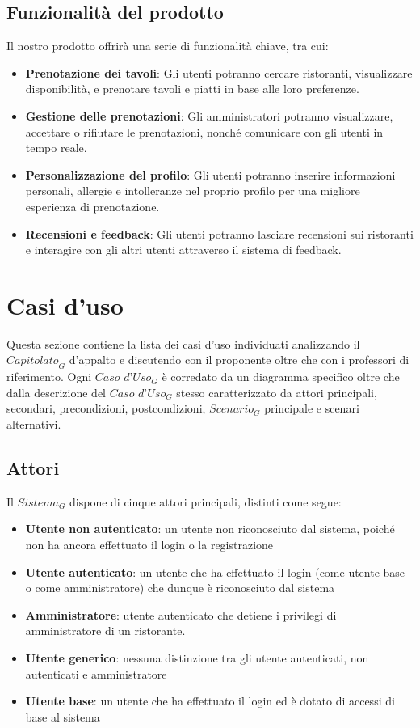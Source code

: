 \documentclass[12pt, oneside]{article}
\begin{document}
\subsection{Funzionalità del prodotto}
Il nostro prodotto offrirà una serie di funzionalità chiave, tra cui:
\begin{itemize}
\item \textbf{Prenotazione dei tavoli}: Gli utenti potranno cercare ristoranti, visualizzare disponibilità, e prenotare tavoli e piatti in base alle loro preferenze.
\item \textbf{Gestione delle prenotazioni}: Gli amministratori potranno visualizzare, accettare o rifiutare le prenotazioni, nonché comunicare con gli utenti in tempo reale.
\item \textbf{Personalizzazione del profilo}: Gli utenti potranno inserire informazioni personali, allergie e intolleranze nel proprio profilo per una migliore esperienza di prenotazione.
\item \textbf{Recensioni e feedback}: Gli utenti potranno lasciare recensioni sui ristoranti e interagire con gli altri utenti attraverso il sistema di feedback.
\end{itemize}


\newpage

\section{Casi d'uso}
Questa sezione contiene la lista dei casi d'uso individuati analizzando il $\textit{Capitolato}_G$ d'appalto e discutendo con il proponente oltre che con i professori di riferimento. Ogni $\textit{Caso d'Uso}_G$ è corredato da un diagramma specifico oltre che dalla descrizione del $\textit{Caso d'Uso}_G$ stesso caratterizzato da attori principali, secondari, precondizioni, postcondizioni, $\textit{Scenario}_G$ principale e scenari alternativi.
\subsection{Attori}
Il $\textit{Sistema}_G$ dispone di cinque attori principali, distinti come segue:
\begin{itemize}
    \item \textbf{Utente non autenticato}: un utente non riconosciuto dal sistema, poiché non ha ancora  effettuato il login o la registrazione
    \item \textbf{Utente autenticato}: un utente che ha effettuato il login (come utente base o come amministratore) che dunque è riconosciuto dal sistema
    \item \textbf{Amministratore}: utente autenticato che detiene i privilegi di amministratore di un ristorante.
    \item \textbf{Utente generico}: nessuna distinzione tra gli utente autenticati, non autenticati e amministratore
    \item \textbf{Utente base}: un utente che ha effettuato il login ed è dotato di accessi di base al sistema
\end{itemize}
\end{document}
